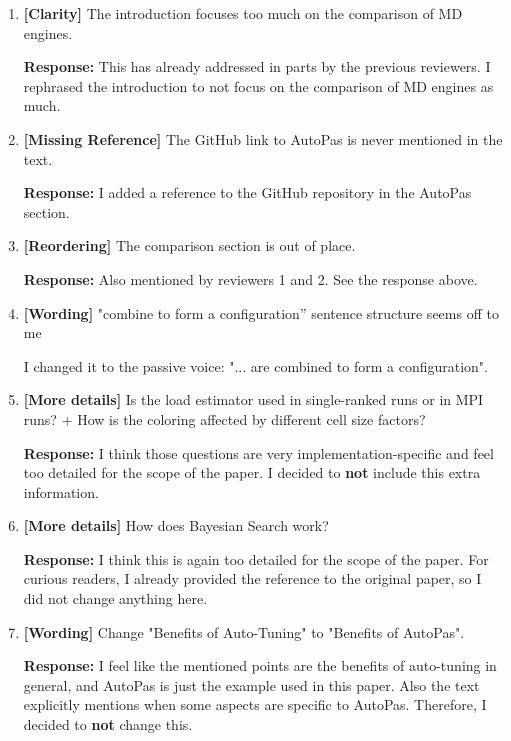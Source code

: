 \documentclass[12pt,a4paper]{article}
\begin{document}
\begin{enumerate}[label=\textbf{Comment \arabic*:}, itemsep=0.8em]
    \item \textbf{[Clarity]} The introduction focuses too much on the comparison of MD engines.

          \textbf{Response:} This has already addressed in parts by the previous reviewers. I rephrased the introduction to not focus on the comparison of MD engines as much.

    \item \textbf{[Missing Reference]} The GitHub link to AutoPas is never mentioned in the text.

          \textbf{Response:} I added a reference to the GitHub repository in the AutoPas section.

    \item \textbf{[Reordering]} The comparison section is out of place.

          \textbf{Response:} Also mentioned by reviewers 1 and 2. See the response above.

    \item \textbf{[Wording]} "combine to form a configuration” sentence structure seems off to me

          I changed it to the passive voice: "... are combined to form a configuration".

    \item \textbf{[More details]} Is the load estimator used in single-ranked runs or in MPI runs? + How is the coloring affected by different cell size factors?

          \textbf{Response:} I think those questions are very implementation-specific and feel too detailed for the scope of the paper. I decided to \textbf{not} include this extra information.

    \item \textbf{[More details]} How does Bayesian Search work?

          \textbf{Response:} I think this is again too detailed for the scope of the paper. For curious readers, I already provided the reference to the original paper, so I did not change anything here.

    \item \textbf{[Wording]} Change "Benefits of Auto-Tuning" to "Benefits of AutoPas".

          \textbf{Response:} I feel like the mentioned points are the benefits of auto-tuning in general, and AutoPas is just the example used in this paper. Also the text explicitly mentions when some aspects are specific to AutoPas. Therefore, I decided to \textbf{not} change this.


\end{enumerate}
\end{document}
